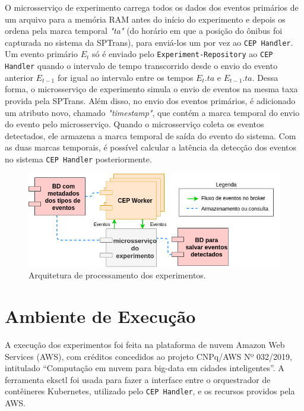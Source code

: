 O microsserviço de experimento carrega todos os dados dos eventos primários de um arquivo para a memória RAM antes do início do experimento e depois os ordena pela marca temporal \textit{"ta"} (do horário em que a posição do ônibus foi capturada no sistema da SPTrans), para enviá-los um por vez ao \texttt{CEP Handler}. Um evento primário $E_t$ só é enviado pelo \texttt{Experiment-Repository} ao \texttt{CEP Handler} quando o intervalo de tempo transcorrido desde o envio do evento anterior $E_{t-1}$ for igual ao intervalo entre os tempos $E_t.ta$ e $E_{t-1}.ta$. 
Dessa forma, o microsserviço de experimento simula o envio de eventos na mesma taxa provida pela SPTrans. 
Além disso, no envio dos eventos primários, é adicionado um atributo novo, chamado \textit{"timestamp"}, que contém a marca temporal do envio do evento pelo microsserviço. Quando o microsserviço coleta os eventos detectados, ele armazena a marca temporal de saída do evento do sistema. Com as duas marcas temporais, é possível calcular a latência da detecção dos eventos no sistema \texttt{CEP Handler} posteriormente.  



\begin{figure}[tb]
\centering
\includegraphics[width=\textwidth]{figuras/arquiteturaexp.png}
\caption{Arquitetura de processamento dos experimentos.}
\label{fig:experiment_arch_diagram}
\end{figure}

\section{Ambiente de Execução} 
A execução dos experimentos foi feita na plataforma de nuvem Amazon Web Services (AWS), com créditos concedidos ao projeto CNPq/AWS Nº 032/2019, intitulado ``Computação em nuvem para big-data em cidades inteligentes''.
A ferramenta eksctl \citep{EKSCTL} foi usada para fazer a interface entre o orquestrador de contêineres Kubernetes, utilizado pelo \texttt{CEP Handler}, e os recursos providos pela AWS.

